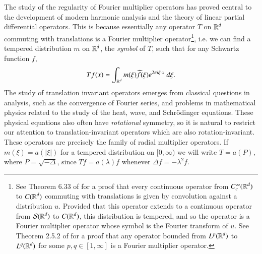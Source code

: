 The study of the regularity of Fourier multiplier operators has proved central to the development of modern harmonic analysis and the theory of linear partial differential operators. This is because essentially any  operator $T$ on $\operatorname{\mathbb{R}}^d$ commuting with translations is a Fourier multiplier operator\footnote{See Theorem 6.33 of \cite{RudinFunc} for a proof that every continuous operator from $C_c^\infty(\operatorname{\mathbb{R}}^d)$ to $C(\operatorname{\mathbb{R}}^d)$ commuting with translations is given by convolution against a distribution $u$. Provided that this operator extends to a continuous operator from $\mathcal{S}(\operatorname{\mathbb{R}}^d)$ to $C(\operatorname{\mathbb{R}}^d)$, this distribution is tempered, and so the operator is a Fourier multiplier operator whose symbol is the Fourier transform of $u$. See Theorem 2.5.2 of \cite{Grafakos} for a proof that any operator bounded from $L^p(\operatorname{\mathbb{R}}^d)$ to $L^q(\operatorname{\mathbb{R}}^d)$ for some $p,q \in [1,\infty]$ is a Fourier multiplier operator.}, i.e. we can find a tempered distribution $m$ on $\operatorname{\mathbb{R}}^d$, the \emph{symbol} of $T$, such that for any Schwartz function $f$,
%
\begin{equation}
  Tf(x) = \int_{\operatorname{\mathbb{R}}^d} m(\xi) \widehat{f}(\xi) e^{2 \pi i \xi \cdot x}\; d\xi.
\end{equation}
%
%
%
%
%
The study of translation invariant operators emerges from classical questions in analysis, such as the convergence of Fourier series, and problems in mathematical physics related to the study of the heat, wave, and Schr\"{o}dinger equations. These physical equations also often have \emph{rotational} symmetry, so it is natural to restrict our attention to translation-invariant operators which are also rotation-invariant. These operators are precisely the family of radial multiplier operators. If $m(\xi) = a(|\xi|)$ for a tempered distribution on $[0,\infty)$ we will write $T = a(P)$, where $P = \sqrt{-\Delta}$, since $Tf = a(\lambda) f$ whenever $\Delta f = - \lambda^2 f$.
